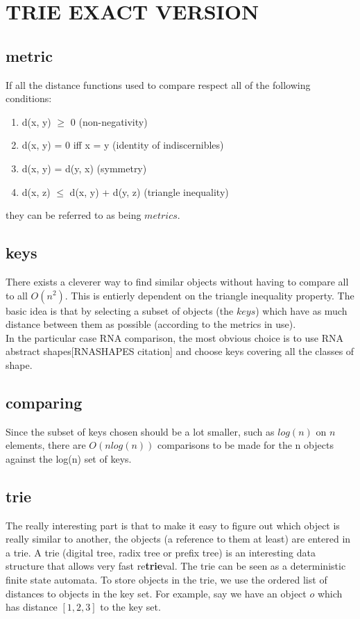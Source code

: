 \documentclass[a4paper, 12pt] {article}
\begin{document}
\section*{TRIE EXACT VERSION}
\subsection*{metric}
If all the distance functions used to compare respect all of the following conditions:
\begin{enumerate}
  \item d(x, y) $\geq$ 0 (non-negativity)
  \item d(x, y) = 0 iff x = y (identity of indiscernibles)
  \item d(x, y) = d(y, x) (symmetry)
  \item d(x, z) $\leq$ d(x, y) + d(y, z) (triangle inequality)
\end{enumerate}\noindent
they can be referred to as being $metrics$. 
\subsection*{keys}
There exists a cleverer way to find similar objects without having to compare all to all
$O(n^2)$. This is entierly dependent on the triangle inequality property. The basic idea 
is that by selecting a subset of objects (the $keys$) which have as much distance between them as possible (according
to the metrics in use).\\ \noindent
In the particular case RNA comparison, the most obvious choice is to use RNA abstract shapes[RNASHAPES citation]
and choose keys covering all the classes of shape.
\subsection*{comparing}
Since the subset of keys chosen should be a lot smaller, such as $log(n)$ on $n$ elements, there are $O(nlog(n))$ comparisons to be made 
for the n objects against the log(n) set of keys.
\subsection*{trie}
The really interesting part is that to make it easy to figure out which object is really similar to another, the objects (a reference to them at least)
are entered in a trie. A trie (digital tree, radix tree or prefix tree) is an interesting data structure that allows very fast re{\bf{trie}}val. The trie can
be seen as a deterministic finite state automata. To store objects in the trie, we use the ordered list of distances to objects in the key set. 
For example, say we have an object $o$ which has distance $[1,2,3]$ to the key set.
\end{document}
